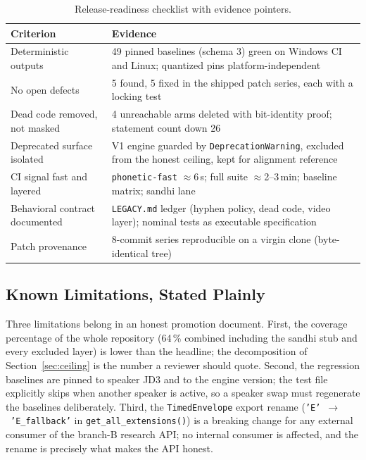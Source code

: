 \documentclass[11pt,a4paper]{article}
\newcommand{\code}[1]{\texttt{#1}}
\newcommand{\pct}[1]{{#1}\,\%}
\begin{document}
\begin{table}[htbp]
\centering
\caption{Release-readiness checklist with evidence pointers.}
\label{tab:checklist}
\small
\begin{tabularx}{\textwidth}{@{ } l X }
\toprule
\textbf{Criterion} & \textbf{Evidence} \\
\midrule
Deterministic outputs & 49 pinned baselines (schema 3) green on Windows CI and Linux; quantized pins platform-independent \\
No open defects & 5 found, 5 fixed in the shipped patch series, each with a locking test \\
Dead code removed, not masked & 4 unreachable arms deleted with bit-identity proof; statement count down 26 \\
Deprecated surface isolated & V1 engine guarded by \code{DeprecationWarning}, excluded from the honest ceiling, kept for alignment reference \\
CI signal fast and layered & \code{phonetic-fast} $\approx$6\,s; full suite $\approx$2--3\,min; baseline matrix; sandhi lane \\
Behavioral contract documented & \code{LEGACY.md} ledger (hyphen policy, dead code, video layer); nominal tests as executable specification \\
Patch provenance & 8-commit series reproducible on a virgin clone (byte-identical tree) \\
\bottomrule
\end{tabularx}
\end{table}

\subsection{Known Limitations, Stated Plainly}

Three limitations belong in an honest promotion document. First, the
coverage percentage of the whole repository (\pct{64} combined
including the sandhi stub and every excluded layer) is lower than the
headline; the decomposition of Section~\ref{sec:ceiling} is the
number a reviewer should quote. Second, the regression baselines are
pinned to speaker JD3 and to the engine version; the test file
explicitly skips when another speaker is active, so a speaker swap
must regenerate the baselines deliberately. Third, the
\code{TimedEnvelope} export rename
(\code{'E'}~$\to$~\code{'E\_fallback'} in
\code{get\_all\_extensions()}) is a breaking change for any
external consumer of the branch-B research API; no internal consumer
is affected, and the rename is precisely what makes the API honest.
\end{document}
